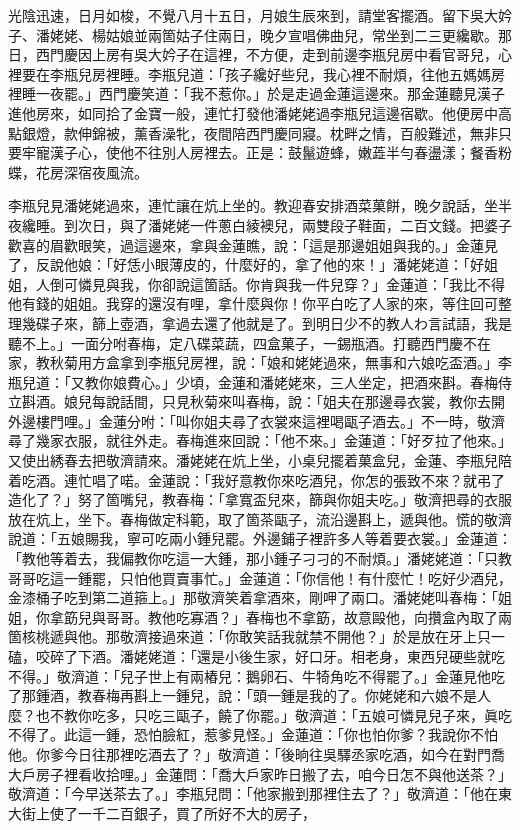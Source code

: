 光陰迅速，日月如梭，不覺八月十五日，月娘生辰來到，請堂客擺酒。留下吳大妗子、潘姥姥、楊姑娘並兩箇姑子住兩日，晚夕宣唱佛曲兒，常坐到二三更纔歇。那日，西門慶因上房有吳大妗子在這裡，不方便，走到前邊李瓶兒房中看官哥兒，心裡要在李瓶兒房裡睡。李瓶兒道：「孩子纔好些兒，我心裡不耐煩，往他五媽媽房裡睡一夜罷。」{}西門慶笑道：「我不惹你。」於是走過金蓮這邊來。那金蓮聽見漢子進他房來，如同拾了金寶一般，連忙打發他潘姥姥過李瓶兒這邊宿歇。他便房中高點銀燈，款伸錦被，薰香澡牝，夜間陪西門慶同寢。枕畔之情，百般難述，無非只要牢寵漢子心，使他不往別人房裡去。正是：鼓鬣遊蜂，嫩蕋半勻春盪漾；餐香粉蝶，花房深宿夜風流。

李瓶兒見潘姥姥過來，連忙讓在炕上坐的。教迎春安排酒菜菓餅，晚夕說話，坐半夜纔睡。到次日，與了潘姥姥一件蔥白綾襖兒，兩雙段子鞋面，二百文錢。把婆子歡喜的眉歡眼笑，過這邊來，拿與金蓮瞧，說：「這是那邊姐姐與我的。」金蓮見了，反說他娘：「好恁小眼薄皮的，什麼好的，拿了他的來！」潘姥姥道：「好姐姐，人倒可憐見與我，你卻說這箇話。你肯與我一件兒穿？」金蓮道：「我比不得他有錢的姐姐。我穿的還沒有哩，拿什麼與你！你平白吃了人家的來，等住回可整理幾碟子來，篩上壺酒，拿過去還了他就是了。到明日少不的教人わ言試語，我是聽不上。」{}一面分咐春梅，定八碟菜蔬，四盒菓子，一錫瓶酒。打聽西門慶不在家，教秋菊用方盒拿到李瓶兒房裡，說：「娘和姥姥過來，無事和六娘吃盃酒。」李瓶兒道：「又教你娘費心。」少頃，金蓮和潘姥姥來，三人坐定，把酒來斟。春梅侍立斟酒。娘兒每說話間，只見秋菊來叫春梅，說：「姐夫在那邊尋衣裳，教你去開外邊樓門哩。」金蓮分咐：「叫你姐夫尋了衣裳來這裡喝甌子酒去。」不一時，敬濟尋了幾家衣服，就往外走。春梅進來回說：「他不來。」金蓮道：「好歹拉了他來。」又使出綉春去把敬濟請來。潘姥姥在炕上坐，小桌兒擺着菓盒兒，金蓮、李瓶兒陪着吃酒。連忙唱了喏。金蓮說：「我好意教你來吃酒兒，你怎的張致不來？就弔了造化了？」努了箇嘴兒，教春梅：「拿寬盃兒來，篩與你姐夫吃。」敬濟把尋的衣服放在炕上，坐下。春梅做定科範，取了箇茶甌子，流沿邊斟上，遞與他。慌的敬濟說道：「五娘賜我，寧可吃兩小鍾兒罷。外邊鋪子裡許多人等着要衣裳。」金蓮道：「教他等着去，我偏教你吃這一大鍾，那小鍾子刁刁的不耐煩。」潘姥姥道：「只教哥哥吃這一鍾罷，只怕他買賣事忙。」金蓮道：「你信他！有什麼忙！吃好少酒兒，金漆桶子吃到第二道箍上。」那敬濟笑着拿酒來，剛呷了兩口。潘姥姥叫春梅：「姐姐，你拿筯兒與哥哥。教他吃寡酒？」春梅也不拿筯，故意毆他，向攢盒內取了兩箇核桃遞與他。{}那敬濟接過來道：「你敢笑話我就禁不開他？」於是放在牙上只一磕，咬碎了下酒。潘姥姥道：「還是小後生家，好口牙。相老身，東西兒硬些就吃不得。」敬濟道：「兒子世上有兩樁兒：鵝卵石、牛犄角吃不得罷了。」金蓮見他吃了那鍾酒，教春梅再斟上一鍾兒，說：「頭一鍾是我的了。你姥姥和六娘不是人麼？也不教你吃多，只吃三甌子，饒了你罷。」敬濟道：「五娘可憐見兒子來，眞吃不得了。此這一鍾，恐怕臉紅，惹爹見怪。」金蓮道：「你也怕你爹？我說你不怕他。{}你爹今日往那裡吃酒去了？」敬濟道：「後晌往吳驛丞家吃酒，如今在對門喬大戶房子裡看收拾哩。」金蓮問：「喬大戶家昨日搬了去，咱今日怎不與他送茶？」敬濟道：「今早送茶去了。」李瓶兒問：「他家搬到那裡住去了？」敬濟道：「他在東大街上使了一千二百銀子，買了所好不大的房子，